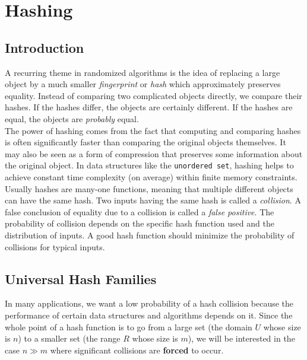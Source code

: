 
\chapter{Hashing}

\section{Introduction}

A recurring theme in randomized algorithms is the idea of replacing a large object by a much smaller 
\textit{fingerprint} or \textit{hash} which approximately preserves equality. Instead of comparing 
two complicated objects directly, we compare their hashes. If the hashes differ, the objects are 
certainly different. If the hashes are equal, the objects are \emph{probably} equal.\\


\noindent The power of hashing comes from the fact that computing and comparing hashes is often significantly 
faster than comparing the original objects themselves. It may also be seen as a form of compression 
that preserves some information about the original object. In data structures like the \texttt{unordered set}, 
hashing helps to achieve constant time complexity (on average) within finite memory constraints.\\


\noindent Usually hashes are many-one functions, meaning that multiple different objects can have the same hash. 
Two inputs having the same hash is called a \textit{collision}. A false conclusion of equality due to a collision is
called a \textit{false positive}. The probability of collision depends on 
the specific hash function used and the distribution of inputs. A good hash function should minimize the 
probability of collisions for typical inputs.

\section{Universal Hash Families}

In many applications, we want a low probability of a hash collision because the performance of certain data 
structures and algorithms depends on it. Since the whole point of a hash function is to go from a large set 
(the domain $U$ whose size is $n$) to a smaller set (the range $R$ whose size is $m$), we will be 
interested in the case $n\gg m$ where significant collisions are \textbf{forced} to occur.\\ 


